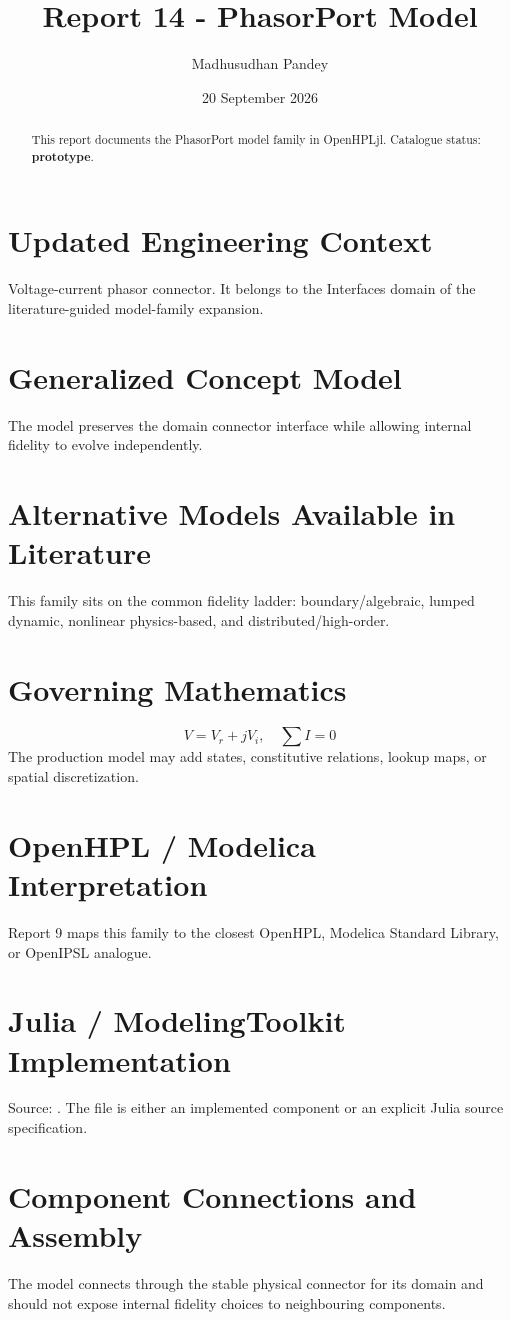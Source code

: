 \documentclass[10pt,a4paper]{article}
\title{Report 14 - PhasorPort Model}
\author{Madhusudhan Pandey}
\date{20 September 2026}
\begin{document}
\maketitle
\begin{abstract}
This report documents the PhasorPort model family in OpenHPLjl. Catalogue status: \textbf{prototype}.
\end{abstract}
\section{Updated Engineering Context}
Voltage-current phasor connector. It belongs to the Interfaces domain of the literature-guided model-family expansion.
\section{Generalized Concept Model}
The model preserves the domain connector interface while allowing internal fidelity to evolve independently.
\section{Alternative Models Available in Literature}
This family sits on the common fidelity ladder: boundary/algebraic, lumped dynamic, nonlinear physics-based, and distributed/high-order.
\section{Governing Mathematics}
\[V=V_r+jV_i,\quad \sum I=0\]
The production model may add states, constitutive relations, lookup maps, or spatial discretization.
\section{OpenHPL / Modelica Interpretation}
Report 9 maps this family to the closest OpenHPL, Modelica Standard Library, or OpenIPSL analogue.
\section{Julia / ModelingToolkit Implementation}
Source: \texttt{}. The file is either an implemented component or an explicit Julia source specification.
\section{Component Connections and Assembly}
The model connects through the stable physical connector for its domain and should not expose internal fidelity choices to neighbouring components.
\end{document}
